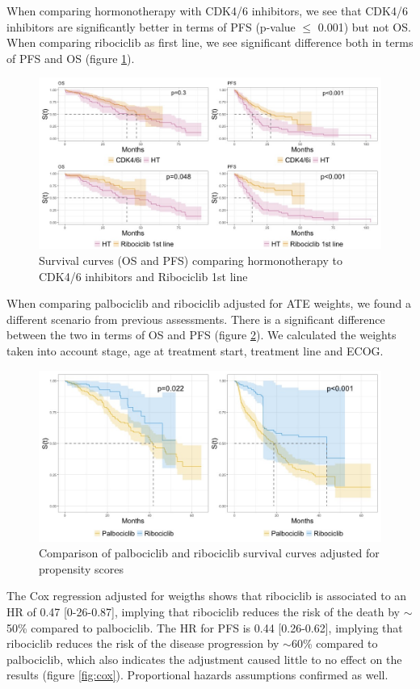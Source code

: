 When comparing hormonotherapy with CDK4/6 inhibitors, we see that CDK4/6 inhibitors are significantly better in terms of PFS (p-value $\le$ 0.001) but not OS. When comparing ribociclib as first line, we see significant difference both in terms of PFS and OS
(figure \ref*{fig:grouped}).
\begin{figure}[ht]
  \centering

  \caption{Survival curves (OS and PFS) comparing hormonotherapy to CDK4/6 inhibitors  and Ribociclib 1st line }\label{fig:grouped} 
  \includegraphics[scale=0.4]{figures/grouped_curve_both.jpeg}%

\end{figure}

When comparing palbociclib and ribociclib adjusted for ATE weights, we found a different scenario from previous assessments. There is a significant difference between the two in terms of OS and PFS (figure \ref*{fig:propensity}). We calculated the weights taken into account stage, age at treatment start, treatment line and ECOG.

\begin{figure}[ht]
  \centering

  \caption{Comparison of palbociclib and ribociclib survival curves adjusted for propensity scores  }\label{fig:propensity} 
  \includegraphics[scale=0.35]{figures/propensity_score_both.jpeg}%

\end{figure}

The Cox regression adjusted for weigths shows that ribociclib is associated to an HR of 0.47 [0-26-0.87], implying that ribociclib reduces the risk of the death by $\sim$50\%  compared to palbociclib. The HR for PFS is 0.44 [0.26-0.62], implying that ribociclib reduces the risk of the disease progression by $\sim$60\% compared to palbociclib, which also indicates the adjustment caused little to no effect on the results (figure \ref{fig:cox}). Proportional hazards assumptions confirmed as well.